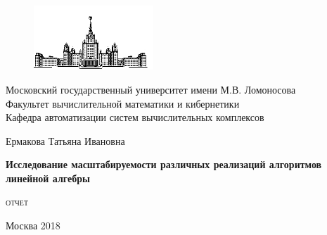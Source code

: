 \documentclass[12pt,fleqn]{article}
\begin{document}
	\sloppy
	
	\begin{titlepage}
		\newpage
		
		\begin{figure}[t]
			\centering
			\includegraphics[width=0.4\textwidth]{img/mgu}
		\end{figure}
		
		\begin{center}
			Московский государственный университет имени М.В. Ломоносова \\
			Факультет вычислительной математики и кибернетики \\
			Кафедра автоматизации систем вычислительных комплексов \\
		\end{center}
		
		\vspace{8em}
		
		\begin{center}
			\large
			Ермакова Татьяна Ивановна
		\end{center}
		
		\begin{center}
			\Large
			\bfseries
			Исследование масштабируемости различных реализаций алгоритмов линейной алгебры
		\end{center}
		
		\vspace{1em}
		
		\begin{center}
			\large
			\textsc{
				отчет
			}
		\end{center}
		
		\vspace{\fill}
		
		\begin{center}
			Москва 2018
		\end{center}
		
	\end{titlepage}
\end{document}
